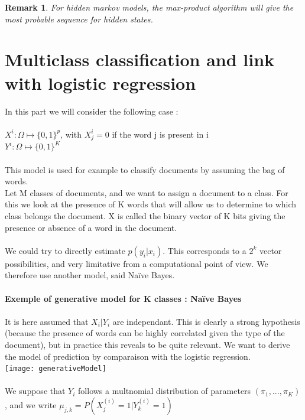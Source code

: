 \documentclass[12pt]{report}
\newtheorem{remark}{Remark}[section]
\begin{document}
\begin{remark}
For hidden markov models, the max-product algorithm will give the most probable sequence for hidden states.
\end{remark}
\section{Multiclass classification and link with logistic regression}



In this part we will consider the following case :~\\ 
~\\
$X^{i} : \Omega \mapsto \{0,1\}^{p} $, with $X_{j}^{i}=0$ if the word j is present in i~\\
$Y^{i} : \Omega \mapsto \{0,1\}^{K} $ ~\\
~\\
This model is used for example to classify documents by assuming the bag of words.~\\
Let M classes of documents, and we want to assign a document to a class. For this we look at the presence of K words that will allow us to determine to which class belongs the document. X is called the binary vector of K bits giving the presence or absence of a word in the document.~\\
~\\
We could try to directly estimate $p (y_{i}| x_{i}) $. This corresponds to a $2^{k}$ vector possibilities, and very limitative from a computational point of view.
We therefore use another model, said Naïve Bayes.~\\
~\\ 
\textbf{Exemple of generative model for K classes : Naïve Bayes}~\\
~\\
It is here assumed that $X_{i} | Y_{i} $ are independant. This is clearly a strong hypothesis (because the presence of words can be highly correlated given the type of the document), but in practice this reveals to be quite relevant. We want to derive the model of prediction by comparaison with the logistic regression. ~\\

\texttt{[image: generativeModel]}~\\
~\\
We suppose that $Y_{i}$ follows a multnomial distribution of parameters $(\pi_{1},...,\pi_{K})$, and we write 
$\mu_{j, k}=P(X_{j}^{(i)}=1 | Y_{k}^{(i)}=1)$~\\
\end{document}
